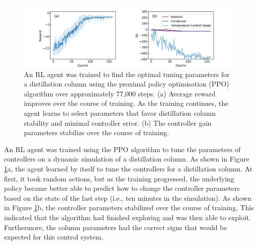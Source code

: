 \begin{figure}[tb]
  \includegraphics[width=\textwidth]{gfx/Chapter05/dis3_74_reward_parameters.png}
  \caption{An RL agent was trained to find the optimal tuning parameters for a distillation column using the proximal policy optimisation (PPO) algorithm over approximately 77,000 steps. (a) Average reward improves over the course of training. As the training continues, the agent learns to select parameters that favor distillation column stability and minimal controller error. (b) The controller gain parameters stabilize over the course of training.}
  \label{ppo_training_curve}
\end{figure}

An RL agent was trained using the PPO algorithm to tune the parameters of controllers on a dynamic simulation of a distillation column. As shown in Figure \ref{ppo_training_curve}a, the agent learned by itself to tune the controllers for a distillation column. At first, it took random actions, but as the training progressed, the underlying policy became better able to predict how to change the controller parameters based on the state of the last step (i.e., ten minutes in the simulation). As shown in Figure \ref{ppo_training_curve}b, the controller parameters stabilized over the course of training. This indicated that the algorithm had finished exploring and was then able to exploit. Furthermore, the column parameters had the correct signs that would be expected for this control system.


